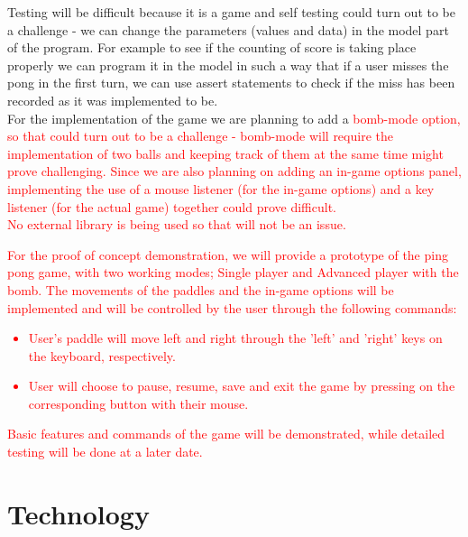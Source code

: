 \documentclass{article}
\begin{document}
Testing will be difficult because it is a game and self testing could turn out to be a challenge - we can change the parameters (values and data) in the model part of the program. For example to see if the counting of score is taking place properly we can program it in the model in such a way that if a user misses the pong in the first turn, we can use assert statements to check if the miss has been recorded as it was implemented to be.\\

For the implementation of the game we are planning to add a \textcolor{red}{bomb-mode option, so that could turn out to be a challenge - bomb-mode will require the implementation of two balls and keeping track of them at the same time might prove challenging. 
Since we are also planning on adding an in-game options panel, implementing the use of a mouse listener (for the in-game options) and a key listener (for the actual game) together could prove difficult.}\\

\textcolor{red}{No external library is being used so that will not be an issue.}\\

\textcolor{red}{For the proof of concept demonstration, we will provide a prototype of the ping pong game, with two working modes; Single player and Advanced player with the bomb. The movements of the paddles and the in-game options will be implemented 
and will be controlled by the user through the following commands:
\begin{itemize}
\item User's paddle will move left and right through the 'left' and 'right' keys on the keyboard, respectively.
\item User will choose to pause, resume, save and exit the game by pressing on the corresponding button with their mouse.
\end{itemize}
Basic features and commands of the game will be demonstrated, while detailed testing will be done at a later date.}

\section {Technology}
\end{document}
